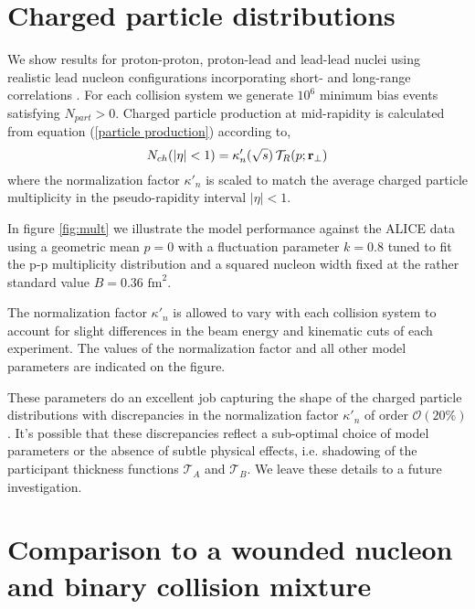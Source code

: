 \documentclass[aps,prl,reprint,amsmath,nofootinbib]{revtex4-1}
\begin{document}
\section{Charged particle distributions}

We show results for proton-proton, proton-lead and lead-lead nuclei using realistic lead nucleon configurations incorporating short- and long-range 
correlations \cite{nucleon-correlations}. For each collision system we generate $10^6$ minimum bias events satisfying $N_{part} > 0$. Charged particle
production at mid-rapidity is calculated from equation (\ref{particle production}) according to, 
\begin{equation}
 N_{ch}(|\eta|<1) = \kappa'_n(\sqrt{s})\, \mathcal{T}_R(p;{\bf r}_\perp)
\end{equation}
where the normalization factor $\kappa'_n$ is scaled to match the average charged particle multiplicity in the pseudo-rapidity interval $|\eta| < 1$.
\begin{figure*}[ht]
    \centering
    \caption{p-p, p-Pb and Pb-Pb multiplicity distributions}
    \label{fig:mult}
\end{figure*}

In figure \ref{fig:mult} we illustrate the model performance against the ALICE data using a geometric mean $p=0$ with a fluctuation parameter $k=0.8$ tuned 
to fit the p-p multiplicity distribution and a squared nucleon width fixed at the rather standard value $B=0.36$ $\mbox{fm}^2$. 

The normalization factor $\kappa'_n$ is allowed to vary with each collision system to account for slight differences in the beam energy and kinematic cuts of 
each experiment. The values of the normalization factor and all other model parameters are indicated on the figure.

These parameters do an excellent job capturing the shape of the charged particle distributions with discrepancies in the normalization factor $\kappa'_n$ of
order $\mathcal{O}(20\%)$. It's possible that these discrepancies reflect a sub-optimal choice of model parameters or the absence of subtle physical effects, 
i.e. shadowing of the participant thickness functions $\mathcal{T}_A$ and $\mathcal{T}_B$. We leave these details to a future investigation.


\section{Comparison to a wounded nucleon and binary collision mixture}
\end{document}
